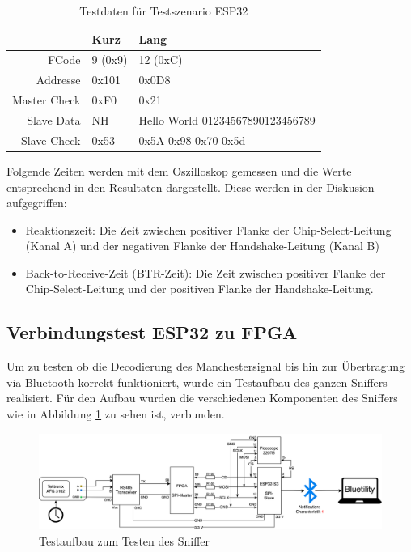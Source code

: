 \begin{table}[H]
    \centering
    \begin{tabular}{r||l|l}
         & Kurz & Lang\\ \hline
        FCode & 9 (0x9) & 12 (0xC)\\ \hline
        Addresse & 0x101 & 0x0D8\\ \hline
        Master Check & 0xF0 & 0x21\\ \hline
        Slave Data & NH & Hello World 01234567890123456789\\ \hline
        Slave Check & 0x53 & 0x5A 0x98 0x70 0x5d\\ 
    \end{tabular}
    \caption{Testdaten für Testszenario ESP32}
    \label{tab:TestDataESP32}
\end{table}

Folgende Zeiten werden mit dem Oszilloskop gemessen und die Werte entsprechend in den Resultaten dargestellt. Diese werden in der Diskusion aufgegriffen:
\begin{itemize}
    \item Reaktionszeit: Die Zeit zwischen positiver Flanke der Chip-Select-Leitung (Kanal A) und der negativen Flanke der Handshake-Leitung (Kanal B)
    \item Back-to-Receive-Zeit (BTR-Zeit): Die Zeit zwischen positiver Flanke der Chip-Select-Leitung und der positiven Flanke der Handshake-Leitung.
\end{itemize}

\subsection{Verbindungstest ESP32 zu FPGA}
\label{subsec:VerbindugstestESP32FPGA}

Um zu testen ob die Decodierung des Manchestersignal bis hin zur Übertragung via Bluetooth korrekt funktioniert, wurde ein Testaufbau des ganzen Sniffers realisiert. Für den Aufbau wurden die verschiedenen Komponenten des Sniffers wie in Abbildung \ref{fig:TestszenarioSniffer} zu sehen ist, verbunden.

\begin{figure}[H]
    \centering
    \includegraphics[width=1\linewidth]{Figures/Chap3/Testszenarien/Testszenario_Sniffer.png}
    \caption{Testaufbau zum Testen des Sniffer}
    \label{fig:TestszenarioSniffer}
\end{figure}


